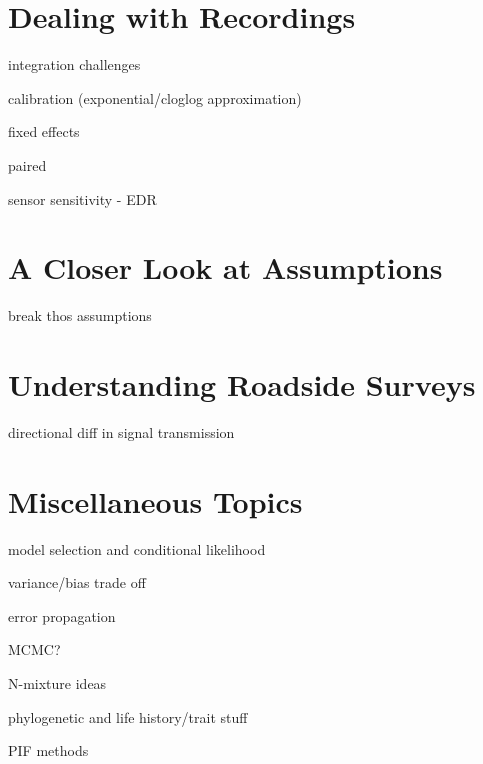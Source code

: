 \documentclass[12pt,]{scrbook}
\begin{document}
\hypertarget{recordings}{%
\chapter{Dealing with Recordings}\label{recordings}}

integration challenges

calibration (exponential/cloglog approximation)

fixed effects

paired

sensor sensitivity - EDR

\hypertarget{assumptions}{%
\chapter{A Closer Look at Assumptions}\label{assumptions}}

break thos assumptions

\hypertarget{roadsides}{%
\chapter{Understanding Roadside Surveys}\label{roadsides}}

directional diff in signal transmission

\hypertarget{extras}{%
\chapter{Miscellaneous Topics}\label{extras}}

model selection and conditional likelihood

variance/bias trade off

error propagation

MCMC?

N-mixture ideas

phylogenetic and life history/trait stuff

PIF methods


\end{document}
